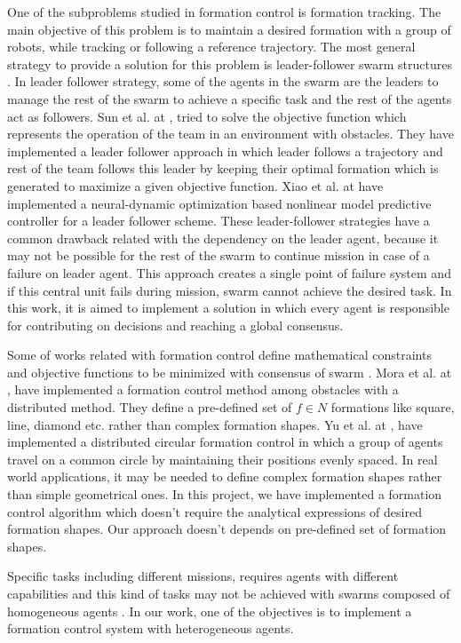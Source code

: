 \documentclass[letterpaper, 10 pt, conference]{ieeeconf}  %
\begin{document}
One of the subproblems studied in formation control is formation tracking. The main objective of this problem is to maintain a desired formation with a group of robots, while tracking or following a reference trajectory. The most general strategy to provide a solution for this problem is leader-follower swarm structures \cite{502,503}. In leader follower strategy, some of the agents in the swarm are the leaders to manage the rest of the swarm to achieve a specific task and the rest of the agents act as followers. Sun et al. at \cite{502}, tried to solve the objective function which represents the operation of the team in an environment with obstacles. They have implemented a leader follower approach in which leader follows a trajectory and rest of the team follows this leader by keeping their optimal formation which is generated to maximize a given objective function. Xiao et al. at \cite{503} have implemented a neural-dynamic optimization based nonlinear model predictive controller for a leader follower scheme. These leader-follower strategies have a common drawback related with the dependency on the leader agent, because it may not be possible for the rest of the swarm to continue mission in case of a failure on leader agent. This approach creates a single point of failure system and if this central unit fails during mission, swarm cannot achieve the desired task. In this work, it is aimed to implement a solution in which every agent is responsible for contributing on decisions and reaching a global consensus. 




Some of works related with formation control define mathematical constraints and objective functions to be minimized with consensus of swarm \cite{501,506}. Mora et al. at \cite{501}, have implemented a formation control method among obstacles with a distributed method. They define a pre-defined set of $f \in N$ formations like square, line, diamond etc. rather than complex formation shapes. Yu et al. at \cite{506}, have implemented a distributed circular formation control in which a group of agents travel on a common circle by maintaining their positions evenly spaced. In real world applications, it may be needed to define complex formation shapes rather than simple geometrical ones. In this project, we have implemented a formation control algorithm which doesn't require the analytical expressions of desired formation shapes. Our approach doesn't depends on pre-defined set of formation shapes.

Specific tasks including different missions, requires agents with different capabilities and this kind of tasks may not be achieved with swarms composed of homogeneous agents \cite{99}. In our work, one of the objectives is to implement a formation control system with heterogeneous agents. 
\end{document}

